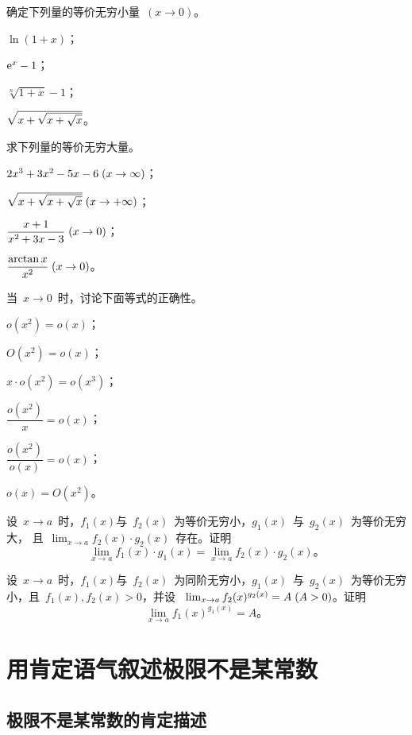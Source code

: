 \begin{exercise}
\item 确定下列量的等价无穷小量~$(x\to 0)$。
\begin{exlistcols}
  \item $\ln(1+x)$；
  \item $\mathrm e^x-1$；
  \item $\sqrt[n]{1+x}-1$；
  \item $\sqrt{x+\smsqrt{x+\sqrt x}}$。
\end{exlistcols}
\item 求下列量的等价无穷大量。
\begin{exlistcols}
  \item $2x^3+3x^2-5x-6\mcond{x\to\infty}$；
  \item $\sqrt{x+\smsqrt{x+\sqrt x}}\mcond{x\to+\infty}$；
  \item $\dfrac{x+1}{x^2+3x-3}\mcond{x\to0}$；
  \item $\dfrac{\arctan x}{x^2}\mcond{x\to0}$。
\end{exlistcols}
\item 当~$x\to0$~时，讨论下面等式的正确性。
\begin{exlistcols}[3]
  \item $o(x^2)=o(x)$；
  \item $O(x^2)=o(x)$；
  \item $x\cdot o(x^2)=o(x^3)$；
  \item $\dfrac{o(x^2)}x=o(x)$；
  \item $\dfrac{o(x^2)}{o(x)}=o(x)$；
  \item $o(x)=O(x^2)$。
\end{exlistcols}
\item 设~$x\to a$~时，$f_1(x)$与~$f_2(x)$~为等价无穷小，$g_1(x)$~与~$g_2(x)$~为等价无穷大，%
且~$\lim_{x\to a}f_2(x)\cdot g_2(x)$~存在。证明
\[
  \lim_{x\to a}f_1(x)\cdot g_1(x)=\lim_{x\to a}f_2(x)\cdot g_2(x)。
\]
\item 设~$x\to a$~时，$f_1(x)$与~$f_2(x)$~为同阶无穷小，$g_1(x)$~与~$g_2(x)$~为等价无穷小，且~$f_1(x),f_2(x)>0$，并设
~$\lim_{x\to a}f_2(x)^{g_2(x)}=A\mcond{A>0}$。证明
\[
  \lim_{x\to a}f_1(x)^{g_1(x)}=A 。
\]
\end{exercise}


\section{用肯定语气叙述极限不是某常数}

\subsection{极限不是某常数的肯定描述}

